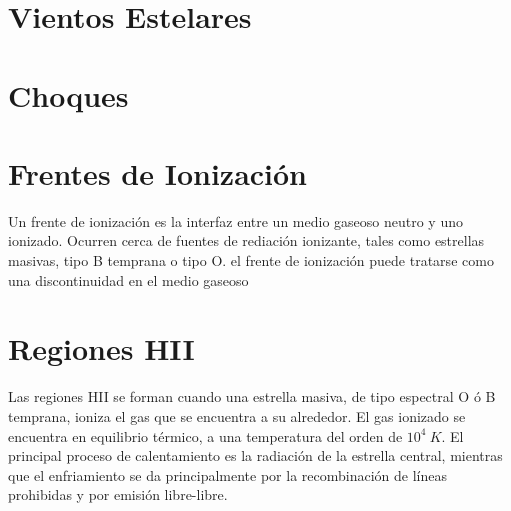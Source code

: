 \section{Vientos Estelares}
\section{Choques}
\section{Frentes de Ionización}
Un frente de ionización es la interfaz entre un medio gaseoso neutro y uno
ionizado. Ocurren cerca de fuentes de rediación ionizante, tales como
estrellas masivas, tipo B temprana o tipo O. el frente de ionización puede
tratarse como una discontinuidad en el medio gaseoso

\section{Regiones HII}
Las regiones HII se forman cuando una estrella masiva, de tipo espectral
O ó B temprana, ioniza el gas que se encuentra a su alrededor. El gas
ionizado se encuentra en equilibrio térmico, a una temperatura del
orden de $10^4~K$. El principal proceso de calentamiento es la
radiación de la estrella central, mientras que el enfriamiento se da
principalmente por la recombinación de líneas prohibidas y por emisión
libre-libre.

